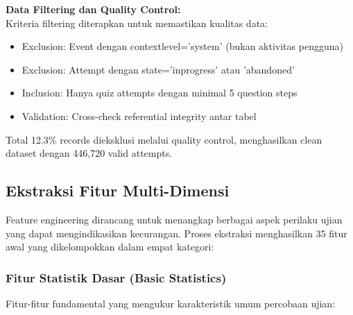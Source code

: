 \textbf{Data Filtering dan Quality Control:} \\
Kriteria filtering diterapkan untuk memastikan kualitas data:
\begin{itemize}
    \item Exclusion: Event dengan contextlevel='system' (bukan aktivitas pengguna)
    \item Exclusion: Attempt dengan state='inprogress' atau 'abandoned'
    \item Inclusion: Hanya quiz attempts dengan minimal 5 question steps
    \item Validation: Cross-check referential integrity antar tabel
\end{itemize}

Total 12.3\% records dieksklusi melalui quality control, menghasilkan clean dataset dengan 446,720 valid attempts.

\subsection{Ekstraksi Fitur Multi-Dimensi}
\label{sec:ekstraksiFiturMultiDimensi}

Feature engineering dirancang untuk menangkap berbagai aspek perilaku ujian yang dapat mengindikasikan kecurangan. Proses ekstraksi menghasilkan 35 fitur awal yang dikelompokkan dalam empat kategori:

\subsubsection{Fitur Statistik Dasar (Basic Statistics)}
\label{sec:fiturStatistikDasar}

Fitur-fitur fundamental yang mengukur karakteristik umum percobaan ujian:

